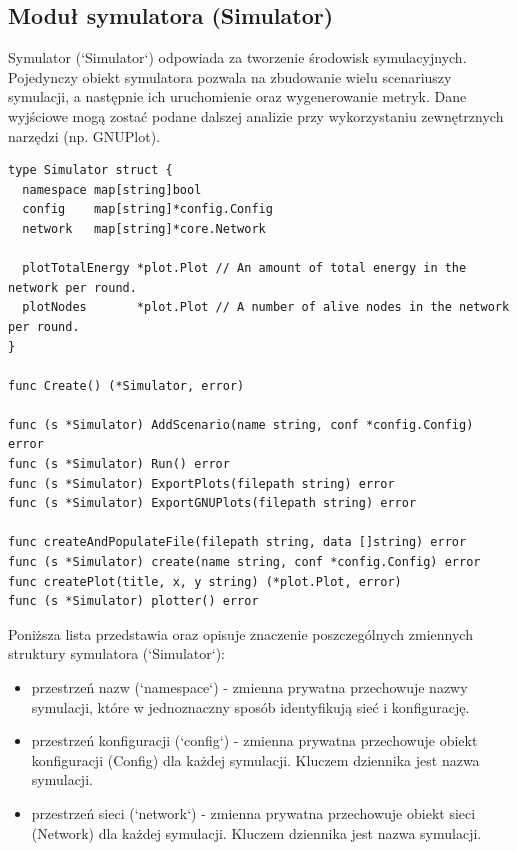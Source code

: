 \documentclass[a4paper,12pt,twoside,openany]{report}
\begin{document}
\subsection{Moduł symulatora (Simulator)}

Symulator (`Simulator`) odpowiada za tworzenie środowisk symulacyjnych.
Pojedynczy obiekt symulatora pozwala na zbudowanie wielu scenariuszy symulacji, a następnie ich uruchomienie oraz
wygenerowanie metryk. Dane wyjściowe mogą zostać podane dalszej analizie przy wykorzystaniu zewnętrznych narzędzi (np. GNUPlot).

\begin{lstlisting}
type Simulator struct {
  namespace map[string]bool
  config    map[string]*config.Config
  network   map[string]*core.Network

  plotTotalEnergy *plot.Plot // An amount of total energy in the network per round.
  plotNodes       *plot.Plot // A number of alive nodes in the network per round.
}

func Create() (*Simulator, error)

func (s *Simulator) AddScenario(name string, conf *config.Config) error
func (s *Simulator) Run() error
func (s *Simulator) ExportPlots(filepath string) error
func (s *Simulator) ExportGNUPlots(filepath string) error

func createAndPopulateFile(filepath string, data []string) error
func (s *Simulator) create(name string, conf *config.Config) error
func createPlot(title, x, y string) (*plot.Plot, error)
func (s *Simulator) plotter() error
\end{lstlisting}

Poniższa lista przedstawia oraz opisuje znaczenie poszczególnych zmiennych struktury symulatora (`Simulator`):

\begin{itemize}
 \item przestrzeń nazw (`namespace`) - zmienna prywatna przechowuje nazwy symulacji, które w jednoznaczny sposób identyfikują sieć i konfigurację.
 \item przestrzeń konfiguracji (`config`) - zmienna prywatna przechowuje obiekt konfiguracji (Config) dla każdej symulacji. Kluczem dziennika jest nazwa symulacji.
 \item przestrzeń sieci (`network`) - zmienna prywatna przechowuje obiekt sieci (Network) dla każdej symulacji. Kluczem dziennika jest nazwa symulacji.
\end{itemize}
\end{document}
